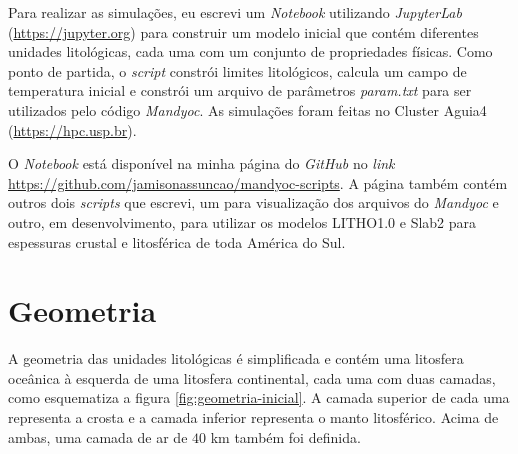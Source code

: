 

%  

Para realizar as simulações, eu escrevi um \textit{Notebook} utilizando \textit{JupyterLab} (\url{https://jupyter.org}) para construir um modelo inicial que contém diferentes unidades litológicas, cada uma com um conjunto de propriedades físicas. Como ponto de partida, o \textit{script} constrói limites litológicos, calcula um campo de temperatura inicial e constrói um arquivo de parâmetros \textit{param.txt} para ser utilizados pelo código \textit{Mandyoc}. As simulações foram feitas no Cluster Aguia4 (\url{https://hpc.usp.br}).

O \textit{Notebook} está disponível na minha página do \textit{GitHub} no \textit{link} \url{https://github.com/jamisonassuncao/mandyoc-scripts}. A página também contém outros dois \textit{scripts} que escrevi, um para visualização dos arquivos do \textit{Mandyoc} e outro, em desenvolvimento, para utilizar os modelos LITHO1.0 \citep{pasyanos2014litho1} e Slab2 \citep{hayes2018slab2} para espessuras crustal e litosférica de toda América do Sul.


\section{Geometria}

A geometria das unidades litológicas é simplificada e contém uma litosfera oceânica à esquerda de uma litosfera continental, cada uma com duas camadas, como esquematiza a figura \ref{fig:geometria-inicial}. A camada superior de cada uma representa a crosta e a camada inferior representa o manto litosférico. Acima de ambas, uma camada de ar de $40$ km também foi definida.

